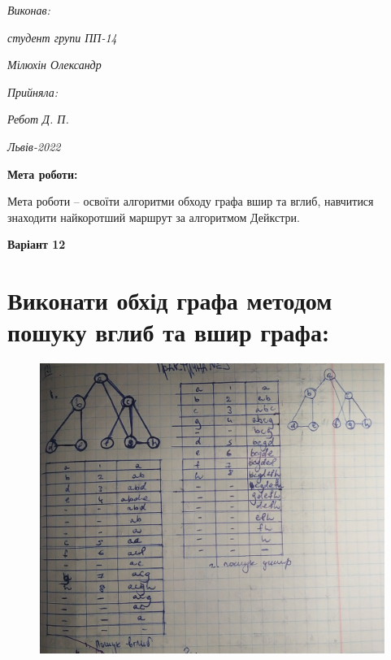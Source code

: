 \documentclass{article}
\begin{document}
\vspace{12.1pt} %
	{\fontsize{14}{22.4}\selectfont
\begin{flushright}
	\textit{Виконав:}

	\textit{студент групи ПП-14}

	\textit{Мілюхін Олександр}

	\textit{Прийняла:}

	\textit{Ребот Д. П.}
\end{flushright}
\vspace{37.4pt} %
\begin{center}
\textit{Львів-2022}
\vspace{37.4pt} %
\end{center}
	}
{\fontsize{14}{16.1}\selectfont
\textbf{Мета роботи:}


Мета роботи – освоїти алгоритми обходу графа вшир та вглиб, навчитися знаходити
найкоротший маршрут за алгоритмом Дейкстри.

\vspace{16pt}
\begin{center}{\textbf{Варіант 12}}\end{center}
\section{Виконати обхід графа методом пошуку вглиб та вшир графа:}
\begin{figure}[h]
	\centering
	\includegraphics[width=17cm]{pr3.jpg}
\end{figure}
\newpage
}
\end{document}
